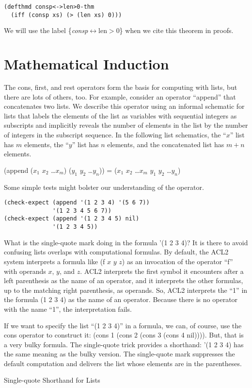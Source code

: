 \begin{lstlisting}
(defthmd consp<->len>0-thm
  (iff (consp xs) (> (len xs) 0)))
\end{lstlisting}

We will use the label \{\emph{consp}$\leftrightarrow$len$>$0\} when we cite this theorem in proofs.

\section{Mathematical Induction}
\label{sec:induction}
The cons, first, and rest operators form the basis for computing with lists, but there are lots of others, too. For example, consider an operator ``append'' that concatenates two lists. We describe this operator using an informal schematic for lists that labels the elements of the list as variables with sequential integers as subscripts and implicitly reveals the number of elements in the list by the number of integers in the subscript sequence.
\label{list-schematic} In the following list schematics, the ``$x$'' list has $m$ elements, the ``$y$'' list has $n$ elements, and the concatenated list has $m+n$ elements.
\begin{center}
(append ($x_1$ $x_2$ \dots $x_m$) ($y_1$ $y_2$ \dots $y_n$)) = ($x_1$ $x_2$ \dots $x_m$ $y_1$ $y_2$ \dots $y_n$)
\end{center}

Some simple tests might bolster our understanding of the operator.

\begin{lstlisting}
(check-expect (append '(1 2 3 4) '(5 6 7))
              '(1 2 3 4 5 6 7))
(check-expect (append '(1 2 3 4 5) nil)
              '(1 2 3 4 5))
\end{lstlisting}

\begin{aside}
What is the single-quote mark doing in the formula '(1 2 3 4)? It is there to avoid confusing lists overlaps with computational formulas. By default, the ACL2 system interprets a formula like (f $x$ $y$ $z$) as an invocation of the operator ``f'' with operands $x$, $y$, and $z$. ACL2 interprets the first symbol it encounters after a left parenthesis as the name of an operator, and it interprets the other formulas, up to the matching right parenthesis, as operands.
So, ACL2 interprets the ``1'' in the formula (1 2 3 4) as the name of an operator. Because there is no operator with the name ``1'', the interpretation fails.

If we want to specify the list ``(1 2 3 4)'' in a formula, we can, of course, use the cons operator to construct it: (cons 1 (cons 2 (cons 3 (cons 4 nil)))). But, that is a very bulky formula. The single-quote trick provides a shorthand: '(1 2 3 4) has the same meaning as the bulky version. The single-quote mark suppresses the default computation and delivers the list whose elements are in the parentheses.
\caption{Single-quote Shorthand for Lists}
\label{quote}
\end{aside}

